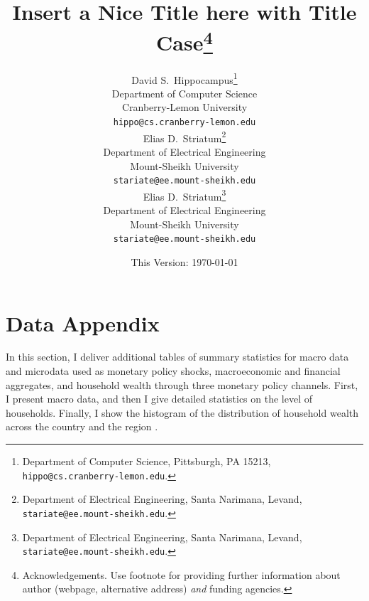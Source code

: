 \documentclass[11pt]{article}
\date{This Version: \today}
\title{Insert a Nice Title here with Title Case\thanks{Acknowledgements. Use footnote for providing further information about author (webpage, alternative address) \emph{and} funding agencies.}}
\author{
    {David S.~Hippocampus}\thanks{Department of Computer Science, Pittsburgh, PA 15213, \texttt{hippo@cs.cranberry-lemon.edu}.} \\
    Department of Computer Science\\
    Cranberry-Lemon University\\
    \texttt{hippo@cs.cranberry-lemon.edu} \\
    \And
    {Elias D.~Striatum}\thanks{Department of Electrical Engineering, Santa Narimana, Levand, \texttt{stariate@ee.mount-sheikh.edu}.} \\
    Department of Electrical Engineering\\
    Mount-Sheikh University\\
    \texttt{stariate@ee.mount-sheikh.edu} \\
    \AND
    {Elias D.~Striatum}\thanks{Department of Electrical Engineering, Santa Narimana, Levand, \texttt{stariate@ee.mount-sheikh.edu}.} \\
    Department of Electrical Engineering\\
    Mount-Sheikh University\\
    \texttt{stariate@ee.mount-sheikh.edu} \\
}
\begin{document}
\maketitle

\renewcommand{\thefootnote}{\arabic{footnote}}
\setcounter{footnote}{0}


\clearpage
\newpage


\appendix
\renewcommand*{\thepage}{A\arabic{page}}
\renewcommand{\thetable}{A\arabic{table}}
\renewcommand{\thefigure}{A\arabic{figure}}

\vspace{-3em}

\tableofcontents

\section{Data Appendix}\label{app:b}

In this section, I deliver additional tables of summary statistics for macro data and microdata used as monetary policy shocks, macroeconomic and financial aggregates, and household wealth through three monetary policy channels. First, I present macro data, and then I give detailed statistics on the level of households. Finally, I show the histogram of the distribution of household wealth across the country and the region \citep{GIZ2015}.


\clearpage\newpage
\printbibliography
\clearpage

\end{document}
